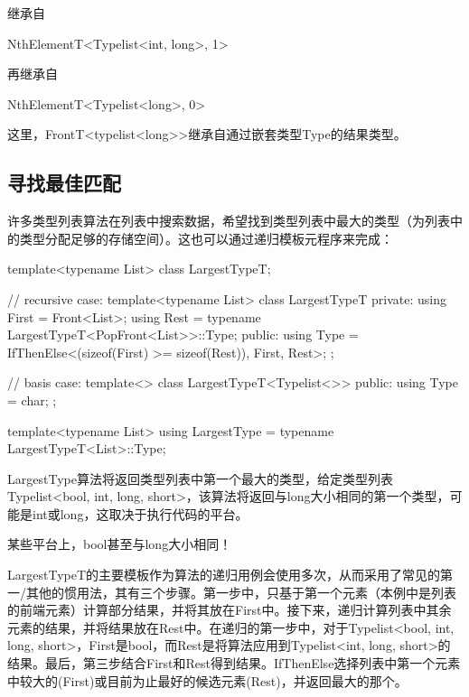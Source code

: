 继承自

\begin{cpp}
NthElementT<Typelist<int, long>, 1>
\end{cpp}

再继承自

\begin{cpp}
NthElementT<Typelist<long>, 0>
\end{cpp}

这里，FrontT<typelist<long>{}>继承自通过嵌套类型Type的结果类型。

\subsection{寻找最佳匹配}

许多类型列表算法在列表中搜索数据，希望找到类型列表中最大的类型（为列表中的类型分配足够的存储空间）。这也可以通过递归模板元程序来完成：

\begin{cpp}
template<typename List>
class LargestTypeT;

// recursive case:
template<typename List>
class LargestTypeT {
	private:
	using First = Front<List>;
	using Rest = typename LargestTypeT<PopFront<List>>::Type;
	public:
	using Type = IfThenElse<(sizeof(First) >= sizeof(Rest)), First, Rest>;
};

// basis case:
template<>
class LargestTypeT<Typelist<>> {
	public:
	using Type = char;
};

template<typename List>
using LargestType = typename LargestTypeT<List>::Type;
\end{cpp}

LargestType算法将返回类型列表中第一个最大的类型，给定类型列表Typelist<bool, int, long, short>，该算法将返回与long大小相同的第一个类型，可能是int或long，这取决于执行代码的平台。

\begin{notice}
某些平台上，bool甚至与long大小相同！
\end{notice}

LargestTypeT的主要模板作为算法的递归用例会使用多次，从而采用了常见的第一/其他的惯用法，其有三个步骤。第一步中，只基于第一个元素（本例中是列表的前端元素）计算部分结果，并将其放在First中。接下来，递归计算列表中其余元素的结果，并将结果放在Rest中。在递归的第一步中，对于Typelist<bool, int, long, short>，First是bool，而Rest是将算法应用到Typelist<int, long, short>的结果。最后，第三步结合First和Rest得到结果。IfThenElse选择列表中第一个元素中较大的(First)或目前为止最好的候选元素(Rest)，并返回最大的那个。

